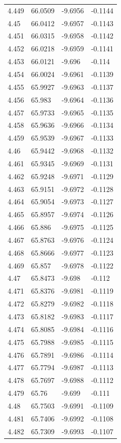 \begin{tabular}{llll}
4.449 & 66.0509 & -9.6956 & -0.1144 \\
4.45 & 66.0412 & -9.6957 & -0.1143 \\
4.451 & 66.0315 & -9.6958 & -0.1142 \\
4.452 & 66.0218 & -9.6959 & -0.1141 \\
4.453 & 66.0121 & -9.696 & -0.114 \\
4.454 & 66.0024 & -9.6961 & -0.1139 \\
4.455 & 65.9927 & -9.6963 & -0.1137 \\
4.456 & 65.983 & -9.6964 & -0.1136 \\
4.457 & 65.9733 & -9.6965 & -0.1135 \\
4.458 & 65.9636 & -9.6966 & -0.1134 \\
4.459 & 65.9539 & -9.6967 & -0.1133 \\
4.46 & 65.9442 & -9.6968 & -0.1132 \\
4.461 & 65.9345 & -9.6969 & -0.1131 \\
4.462 & 65.9248 & -9.6971 & -0.1129 \\
4.463 & 65.9151 & -9.6972 & -0.1128 \\
4.464 & 65.9054 & -9.6973 & -0.1127 \\
4.465 & 65.8957 & -9.6974 & -0.1126 \\
4.466 & 65.886 & -9.6975 & -0.1125 \\
4.467 & 65.8763 & -9.6976 & -0.1124 \\
4.468 & 65.8666 & -9.6977 & -0.1123 \\
4.469 & 65.857 & -9.6978 & -0.1122 \\
4.47 & 65.8473 & -9.698 & -0.112 \\
4.471 & 65.8376 & -9.6981 & -0.1119 \\
4.472 & 65.8279 & -9.6982 & -0.1118 \\
4.473 & 65.8182 & -9.6983 & -0.1117 \\
4.474 & 65.8085 & -9.6984 & -0.1116 \\
4.475 & 65.7988 & -9.6985 & -0.1115 \\
4.476 & 65.7891 & -9.6986 & -0.1114 \\
4.477 & 65.7794 & -9.6987 & -0.1113 \\
4.478 & 65.7697 & -9.6988 & -0.1112 \\
4.479 & 65.76 & -9.699 & -0.111 \\
4.48 & 65.7503 & -9.6991 & -0.1109 \\
4.481 & 65.7406 & -9.6992 & -0.1108 \\
4.482 & 65.7309 & -9.6993 & -0.1107 \\

\end{tabular}
